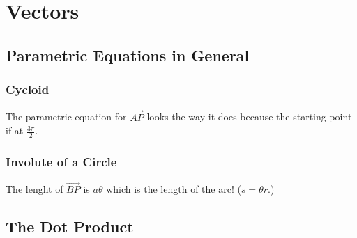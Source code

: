 \section{Vectors}

\subsection{Parametric Equations in General}

\subsubsection{Cycloid}

The parametric equation for $\overrightarrow{AP}$ looks the way it does because the starting point
if at $\frac{3\pi}{2}$.

\subsubsection{Involute of a Circle}

The lenght of $\overrightarrow{BP}$ is $a\theta$ which is the length of the arc! ($s=\theta r$.)


\subsection{The Dot Product}